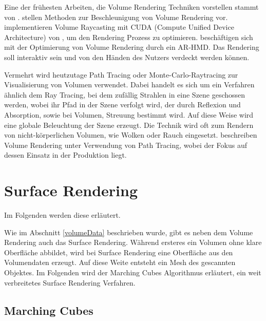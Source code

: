 Eine der frühesten Arbeiten, die Volume Rendering Techniken vorstellen stammt von \cite{Drebin88}.
\cite{Kruger03} stellen Methoden zur Beschleunigung von Volume Rendering vor.
\cite{Marsalek08} implementieren Volume Raycasting mit CUDA (Compute Unified Device Architecture) von \cite{cuda}, um den Rendering Prozess zu optimieren.
\cite{Kutter08} beschäftigen sich mit der Optimierung von Volume Rendering durch ein AR-HMD. Das Rendering soll interaktiv sein und von den Händen des Nutzers verdeckt werden können.

Vermehrt wird heutzutage Path Tracing oder Monte-Carlo-Raytracing zur Visualisierung von Volumen verwendet. Dabei handelt es sich um ein Verfahren ähnlich dem Ray Tracing, bei dem zufällig Strahlen in eine Szene geschossen werden, wobei ihr Pfad in der Szene verfolgt wird, der durch Reflexion und Absorption, sowie bei Volumen, Streuung bestimmt wird. Auf diese Weise wird eine globale Beleuchtung der Szene erzeugt. Die Technik wird oft zum Rendern von nicht-körperlichen Volumen, wie Wolken oder Rauch eingesetzt. 
\cite{Fong17} beschreiben Volume Rendering unter Verwendung von Path Tracing, wobei der Fokus auf dessen Einsatz in der Produktion liegt.

\section{Surface Rendering}		 %
Im Folgenden werden diese erläutert. 

Wie im Abschnitt \ref{volumeData} beschrieben wurde, gibt es neben dem Volume Rendering auch das Surface Rendering. Während ersteres ein Volumen ohne klare Oberfläche abbildet, wird bei Surface Rendering eine Oberfläche aus den Volumendaten erzeugt. Auf diese Weite entsteht ein Mesh des gescannten Objektes.
Im Folgenden wird der Marching Cubes Algorithmus erläutert, ein weit verbreitetes Surface Rendering Verfahren.



\subsection{Marching Cubes}
\label{marchingCubes}

